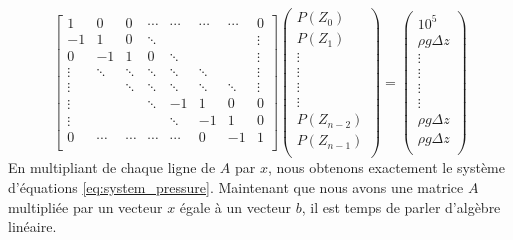 \begin{equation}
\label{eq:ax_b}
\begin{bmatrix}
   1   &    0   &    0   & \cdots & \cdots & \cdots & \cdots &   0    \\
  -1   &    1   &    0   & \ddots &        &        &        & \vdots \\
   0   &   -1   &    1   &    0   & \ddots &        &        & \vdots \\
\vdots & \ddots & \ddots & \ddots & \ddots & \ddots &        & \vdots \\
\vdots &        & \ddots & \ddots & \ddots & \ddots & \ddots & \vdots \\
\vdots &        &        & \ddots &   -1   &    1   &    0   &   0    \\
\vdots &        &        &        & \ddots &   -1   &    1   &   0    \\
   0   & \cdots & \cdots & \cdots & \cdots &    0   &   -1   &   1    \\
\end{bmatrix}
\begin{pmatrix}
  P(Z_0)  \\
  P(Z_1)  \\
\vdots \\
\vdots \\
\vdots \\
\vdots \\
P(Z_{n-2}) \\
  P(Z_{n-1})  \\
\end{pmatrix}
=
\begin{pmatrix}
 10^5  \\
\rho{}g\Delta{z}     \\
\vdots \\
\vdots \\
\vdots \\
\vdots \\
\rho{}g\Delta{z} \\
\rho{}g\Delta{z}    \\
\end{pmatrix}
\end{equation}
En multipliant de chaque ligne de $A$ par $x$, nous obtenons exactement le système d'équations \eqref{eq:system_pressure}.
%
Maintenant que nous avons une matrice $A$ multipliée par un vecteur $x$ égale à un vecteur $b$, il est temps de parler d'algèbre linéaire.
